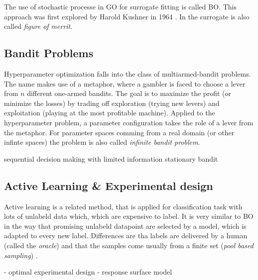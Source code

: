 \documentclass[english]{article}
\begin{document}
The use of stochastic processe in \ac{GO} for surrogate fitting is called \ac{BO}. This approach was first explored by Harold Kushner in 1964 \cite{kushner_new_1964}. In \cite{jones_efficient_1998} the surrogate is also called \textit{figure of merrit}.


\subsection{Bandit Problems}
Hyperparameter optimization falls into the class of multiarmed-bandit problems. The name makes use of a metaphor, where a gambler is faced to choose a lever from $n$ different one-armed bandits. The goal is to maximize the profit (or minimize the losses) by trading off exploration (trying new levers) and exploitation (playing at the most profitable machine). Applied to the hyperparameter problem, a parameter configuration takes the role of a lever from the metaphor. For parameter spaces comming from a real domain (or other infinte spaces) the problem is also called \textit{infinite bandit problem}.


sequential decision making
with limited information
stationary bandit


\subsection{Active Learning \& Experimental design}
Active learning is a related method, that is applied for classification task with lots of unlabeld data which, which are expensive to label. It is very similar to BO in the way that promising unlabeld datapoint are selected by a model, which is adapted to every new label. Differences are tha labels are delivered by a human (called the \textit{oracle}) and that the samples come usually from a finite set (\textit{pool based sampling}) \cite{settles_active_2010}.

 - optimal experimental design
 - response surface model
\end{document}
